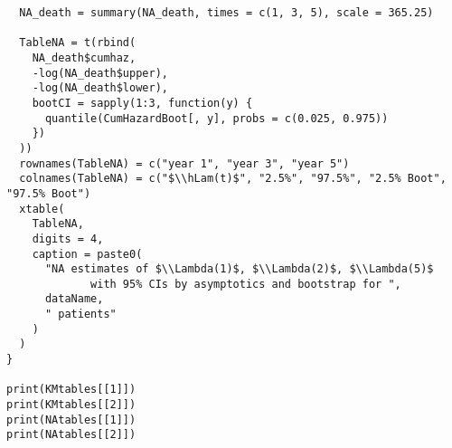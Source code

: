 \documentclass[11pt]{article}
\newcommand{\hLam}{\hat{\Lambda}}
\begin{document}
\begin{lstlisting}
  NA_death = summary(NA_death, times = c(1, 3, 5), scale = 365.25)
  
  TableNA = t(rbind(
    NA_death$cumhaz,
    -log(NA_death$upper),
    -log(NA_death$lower),
    bootCI = sapply(1:3, function(y) {
      quantile(CumHazardBoot[, y], probs = c(0.025, 0.975))
    })
  ))
  rownames(TableNA) = c("year 1", "year 3", "year 5")
  colnames(TableNA) = c("$\\hLam(t)$", "2.5%", "97.5%", "2.5% Boot", "97.5% Boot")
  xtable(
    TableNA,
    digits = 4,
    caption = paste0(
      "NA estimates of $\\Lambda(1)$, $\\Lambda(2)$, $\\Lambda(5)$
             with 95% CIs by asymptotics and bootstrap for ",
      dataName,
      " patients"
    )
  )
}

print(KMtables[[1]])
print(KMtables[[2]])
print(NAtables[[1]])
print(NAtables[[2]])

\end{lstlisting}
\end{document}
